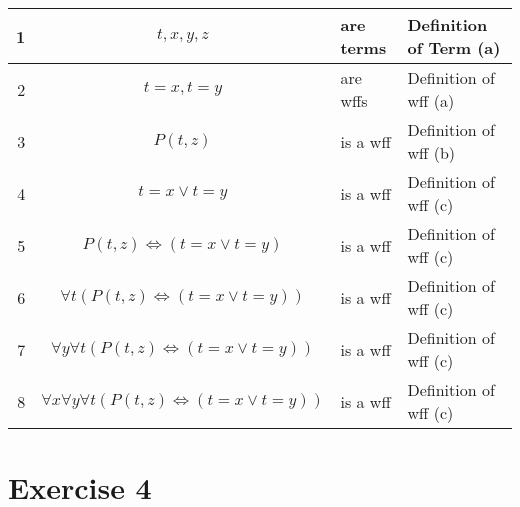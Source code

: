 \documentclass[11pt]{article}
\begin{document}
\begin{center}
    \begin{tabular}{|r|c l|l|}
        \hline
        1 & $t, x, y, z$ & are terms & Definition of Term (a) \\
        \hline
        2 & $t=x, t=y$ & are wffs & Definition of wff (a) \\
        \hline
        3 & $P(t,z)$ & is a wff & Definition of wff (b) \\ 
        \hline
        4 & $t=x \lor t=y$ & is a wff & Definition of wff (c) \\
        \hline
        5 & $P(t,z) \iff (t=x \lor t=y)$ & is a wff & Definition of wff (c) \\
        \hline
        6 & $\forall t(P(t,z) \iff (t=x \lor t=y))$ & is a wff & Definition of wff (c) \\
        \hline
        7 & $\forall y\forall t(P(t,z) \iff (t=x \lor t=y))$ & is a wff & Definition of wff (c) \\
        \hline
        8 & $\forall x\forall y\forall t(P(t,z) \iff (t=x \lor t=y))$ & is a wff & Definition of wff (c) \\
        \hline
    \end{tabular}
\end{center}




\section*{Exercise 4}
\\
\end{document}
